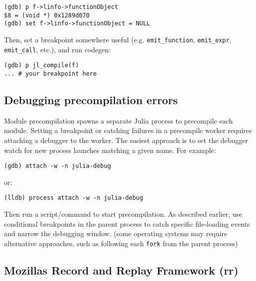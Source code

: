 \begin{lstlisting}
(gdb) p f->linfo->functionObject
$8 = (void *) 0x1289d070
(gdb) set f->linfo->functionObject = NULL
\end{lstlisting}



Then, set a breakpoint somewhere useful (e.g. \texttt{emit\_function}, \texttt{emit\_expr}, \texttt{emit\_call}, etc.), and run codegen:




\begin{lstlisting}
(gdb) p jl_compile(f)
... # your breakpoint here
\end{lstlisting}



\hypertarget{15283936980874101721}{}


\subsection{Debugging precompilation errors}



Module precompilation spawns a separate Julia process to precompile each module. Setting a breakpoint or catching failures in a precompile worker requires attaching a debugger to the worker. The easiest approach is to set the debugger watch for new process launches matching a given name. For example:




\begin{lstlisting}
(gdb) attach -w -n julia-debug
\end{lstlisting}



or:




\begin{lstlisting}
(lldb) process attach -w -n julia-debug
\end{lstlisting}



Then run a script/command to start precompilation. As described earlier, use conditional breakpoints in the parent process to catch specific file-loading events and narrow the debugging window. (some operating systems may require alternative approaches, such as following each \texttt{fork} from the parent process)



\hypertarget{2874239207045478266}{}


\subsection{Mozilla{\textquotesingle}s Record and Replay Framework (rr)}



